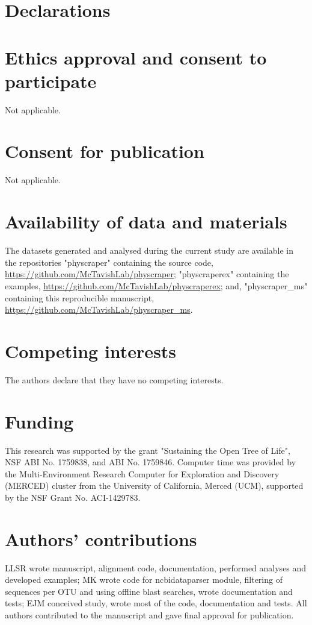 \documentclass{bmcart}
\begin{document}
\section*{Declarations}

\begin{backmatter}

\section*{Ethics approval and consent to participate}
Not applicable.

\section*{Consent for publication}
Not applicable.

\section*{Availability of data and materials}

The datasets generated and analysed during the current study are available in
the repositories "physcraper" containing the source code,
\href{https://github.com/McTavishLab/physcraper}{https://github.com/McTavishLab/physcraper};
"physcraperex" containing the examples,
\href{https://github.com/McTavishLab/physcraperex}{https://github.com/McTavishLab/physcraperex};
and, "physcraper\_ms" containing this reproducible manuscript,
\href{https://github.com/McTavishLab/physcraper\_ms}{https://github.com/McTavishLab/physcraper\_ms}.

\section*{Competing interests}
The authors declare that they have no competing interests.

\section*{Funding}
This research was supported by the grant "Sustaining the Open Tree of Life", NSF ABI
No. 1759838, and ABI No. 1759846.
Computer time was provided by the Multi-Environment Research Computer for
Exploration and Discovery (MERCED) cluster from the University of California,
Merced (UCM), supported by the NSF Grant No. ACI-1429783.

\section*{Authors' contributions}
LLSR wrote manuscript, alignment code, documentation, performed analyses and developed examples; MK wrote code for ncbidataparser module, filtering of sequences per OTU and using offline blast searches, wrote documentation and tests; EJM conceived study, wrote most of the code, documentation and tests.
All authors contributed to the manuscript and gave final approval for publication.



\end{backmatter}
\end{document}
